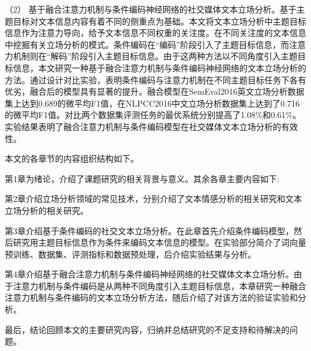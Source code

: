 （2） 基于融合注意力机制与条件编码神经网络的社交媒体文本立场分析。基于主题目标对文本信息内容有着不同的侧重点为基础。本文将文本立场分析中主题目标信息作为注意力导向，给予文本信息不同权重的关注度。在不同关注度的文本信息中挖掘有关立场分析的模式。条件编码在“编码”阶段引入了主题目标信息，而注意力机制则在“解码”阶段引入主题目标信息。由于这两种方法以不同角度引入主题目标信息，本文研究一种基于融合注意力机制与条件编码神经网络的文本立场分析的方法。通过设计对比实验，表明条件编码与注意力机制在不同主题目标任务下各有优劣，融合后的模型具有显著的提升。融合模型在SemEval2016英文立场分析数据集上达到0.689的微平均F1值，在NLPCC2016中文立场分析数据集上达到了0.716的微平均F1值。对比两个数据集评测任务的最优系统分别提高了1.08\%和0.61\%。实验结果表明了融合注意力机制与条件编码模型在社交媒体文本立场分析的有效性。

本文的各章节的内容组织结构如下。

第1章为绪论，介绍了课题研究的相关背景与意义。其余各章主要内容如下:

第2章介绍立场分析领域的常见技术，分别介绍了文本情感分析的相关研究和文本立场分析的相关研究。

第3章介绍基于条件编码的社交文本立场分析。在此章首先介绍条件编码模型，然后研究用主题目标信息作为条件来编码文本信息的模型。在实验部分简介了词向量预训练、数据集、评测指标和数据预处理，后介绍实验结果与分析。

第4章介绍基于融合注意力机制与条件编码神经网络的社交媒体文本立场分析。由于注意力机制与条件编码是从两种不同角度引入主题目标信息，本章研究一种融合注意力机制与条件编码的文本立场分析方法，随后介绍了对该方法的验证实验和分析。

最后，结论回顾本文的主要研究内容，归纳并总结研究的不足支持和待解决的问题。

